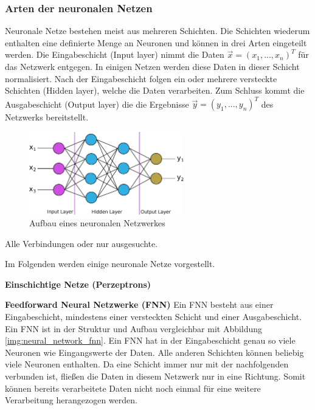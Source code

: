 \subsubsection{Arten der neuronalen Netzen}
Neuronale Netze bestehen meist aus mehreren Schichten. Die Schichten wiederum enthalten eine definierte Menge an Neuronen und können in drei Arten eingeteilt werden. Die Eingabeschicht (Input layer) nimmt die Daten $\overrightarrow{x}=(x_{1}, ..., x_{n})^T$ für das Netzwerk entgegen. In einigen Netzen werden diese Daten in dieser Schicht normalisiert. Nach der Eingabeschicht folgen ein oder mehrere versteckte Schichten (Hidden layer), welche die Daten verarbeiten. Zum Schluss kommt die Ausgabeschicht (Output layer) die die Ergebnisse $\overrightarrow{y}=(y_{1}, ..., y_{n})^T$ des Netzwerks bereitstellt.


\begin{figure}[!ht]
	\includegraphics[width=0.6\textwidth]{content/chapter_basics/images/neuronal_network.eps}
	\centering
	\caption{Aufbau eines neuronalen Netzwerkes}
	\label{img:neural_network}
\end{figure}

Alle Verbindungen oder nur ausgesuchte.\vspace{0.2cm}

Im Folgenden werden einige neuronale Netze vorgestellt.\vspace{0.2cm}

\textbf{Einschichtige Netze (Perzeptrons)}\vspace{0.2cm}

\textbf{Feedforward Neural Netzwerke (FNN)}\vspace{0.2cm}
Ein FNN besteht aus einer Eingabeschicht, mindestens einer versteckten Schicht und einer Ausgabeschicht. Ein FNN ist in der Struktur und Aufbau vergleichbar mit Abbildung \ref{img:neural_network_fnn}. Ein FNN hat in der Eingabeschicht genau so viele Neuronen wie Eingangswerte der Daten. Alle anderen Schichten können beliebig viele Neuronen enthalten. Da eine Schicht immer nur mit der nachfolgenden verbunden ist, fließen die Daten in diesem Netzwerk nur in eine Richtung. Somit können bereits verarbeitete Daten nicht noch einmal für eine weitere Verarbeitung herangezogen werden.

